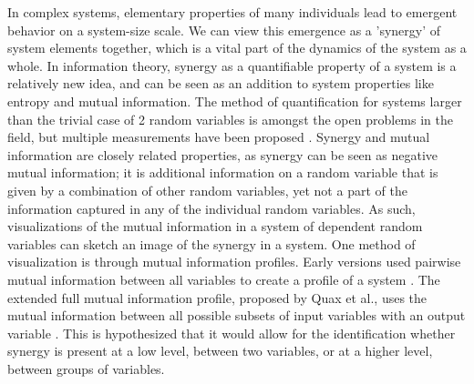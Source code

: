 \documentclass[../main.tex]{subfiles}
\begin{document}
In complex systems, elementary properties of many individuals lead to emergent behavior on a system-size scale.
We can view this emergence as a ’synergy’ of system elements together, which is a vital part of the dynamics of the system as a whole.
In information theory, synergy as a quantifiable property of a system is a relatively new idea, and can be seen as an addition to system properties like entropy and mutual information.
The method of quantification for systems larger than the trivial case of 2 random variables is amongst the open problems in the field, but multiple measurements have been proposed \cite{olbrich2015information}.
Synergy and mutual information are closely related properties, as synergy can be seen as negative mutual information; it is additional information on a random variable that is given by a combination of other random variables, yet not a part of the information captured in any of the individual random variables.
As such, visualizations of the mutual information in a system of dependent random variables can sketch an image of the synergy in a system.
One method of visualization is through mutual information profiles.
Early versions used pairwise mutual information between all variables to create a profile of a system \cite{bar2013computationally}. 
The extended full mutual information profile, proposed by Quax et al., uses the mutual information between all possible subsets of input variables with an output variable \cite{quax2017quantifying}.
This is hypothesized that it would allow for the identification whether synergy is present at a low level, between two variables, or at a higher level, between groups of variables.
\end{document}
